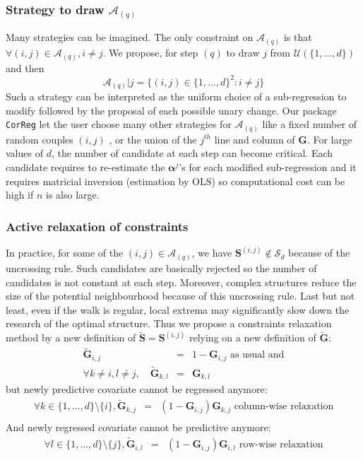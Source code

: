 \documentclass[12pt,a4paper]{report}
\begin{document}
		\subsubsection{Strategy to draw $\mathcal{A}_{(q)}$}
			Many strategies can be imagined. 
		The only constraint on $\mathcal{A}_{(q)}$ is that $\forall (i,j) \in \mathcal{A}_{(q)}, i\neq j$.				
		We propose, for step $(q)$ to draw $j$ from $\mathcal{U}(\{1,\dots,d\})$ and then 
		\begin{equation}
			\mathcal{A}_{(q)}|j=\{ (i,j) \in  \{1,\dots,d\}^2 :i \neq j \}
		\end{equation}
			Such a strategy can be interpreted as the uniform choice of a sub-regression to modify followed by the proposal of each possible unary change.
			Our package {\tt CorReg} let the user choose many other strategies for $\mathcal{A}_{(q)}$ like a fixed number of random couples $(i,j)$ , or the union of the $j^{th}$ line and column of $\boldsymbol{G}$. For large values of $d$, the number of candidate at each step can become critical. Each candidate requires to re-estimate the $\boldsymbol{\alpha}^j$'s for each modified sub-regression and it requires matricial inversion (estimation by OLS) so computational cost can be high if $n$ is also large.
		\subsubsection{Active relaxation of constraints}
		In practice, for some of the $(i,j) \in \mathcal{A}_{(q)}$, we have $\boldsymbol{S}^{(i,j)}\notin \mathcal{S}_d$ because of the uncrossing rule. Such candidates are basically rejected so the number of candidates is not constant at each step. Moreover, complex structures reduce the size of the potential neighbourhood because of this uncrossing rule. Last but not least, even if the walk is regular, local extrema may significantly slow down the research of the optimal structure.
		Thus we propose a constraints relaxation method by a new definition of $\tilde{\boldsymbol{S}}=\boldsymbol{S}^{(i,j)}$ relying on a new definition of $\tilde{\boldsymbol{G}}$:
	\begin{eqnarray}
		\tilde{\boldsymbol{G}}_{i,j}&=&1-\boldsymbol{G}_{i,j} \textrm{ as usual and}\\
		\forall k \neq i, l\neq j, \quad	\tilde{\boldsymbol{G}}_{k,l}&=&\boldsymbol{G}_{k,l}
\end{eqnarray}			
but newly predictive covariate cannot be regressed anymore:
		\begin{eqnarray}
		\forall k \in \{1,\dots,d\}\setminus \{i\}, \tilde{\boldsymbol{G}}_{k,j}&=&(1-\boldsymbol{G}_{i,j})\boldsymbol{G}_{k,j} \textrm{ column-wise relaxation} \\
				\end{eqnarray}
And newly regressed covariate cannot be predictive anymore:
		\begin{eqnarray}
		\forall l \in \{1,\dots,d\}\setminus \{j\}, \tilde{\boldsymbol{G}}_{i,l}&=&(1-\boldsymbol{G}_{i,j})\boldsymbol{G}_{i,l} \textrm{ row-wise relaxation}
	\end{eqnarray} \\
	
\end{document}
